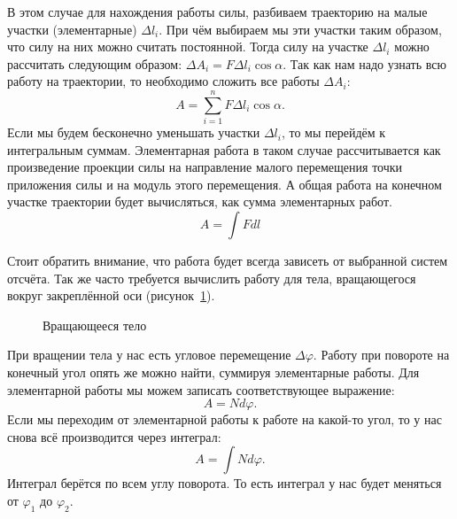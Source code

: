 В этом случае для нахождения работы силы, разбиваем траекторию на малые
участки (элементарные) $\Delta l_i$. При чём выбираем мы эти участки таким
образом, что силу на них можно считать постоянной. Тогда силу на участке
$\Delta l_i$ можно рассчитать следующим образом: \( \Delta A_i = F \Delta l_i
\cos \alpha \). Так как нам надо узнать всю работу на траектории, то необходимо
сложить все работы $\Delta A_i$: \[
  A = \sum_{i=1}^{n} F \Delta l_i \cos \alpha
.\] Если мы будем бесконечно уменьшать участки $\Delta l_i$, то мы перейдём к
интегральным суммам. Элементарная работа в таком случае рассчитывается как
произведение проекции силы на направление малого перемещения точки приложения
силы и на модуль этого перемещения. А общая работа на конечном участке
траектории будет вычисляться, как сумма элементарных работ.
\begin{equation}
  A = \int F dl
\end{equation}

Стоит обратить внимание, что работа будет всегда зависеть от выбранной систем
отсчёта. Так же часто требуется вычислить работу для тела, вращающегося вокруг
закреплённой оси (рисунок~\ref{fig:rotating-body}).

\begin{figure}[htpb]
  \begin{center}
  \end{center}
  \caption{Вращающееся тело}%
  \label{fig:rotating-body}
\end{figure}

При вращении тела у нас есть угловое перемещение $\Delta \varphi$. Работу при
повороте на конечный угол опять же можно найти, суммируя элементарные работы.
Для элементарной работы мы можем записать соответствующее выражение: \[
  A = N d \varphi
.\] Если мы переходим от элементарной работы к работе на какой-то угол, то у
нас снова всё производится через интеграл: \[
  A = \int N d \varphi
.\] Интеграл берётся по всем углу поворота. То есть интеграл у нас будет
меняться от $\varphi_1$ до $\varphi_2$.

